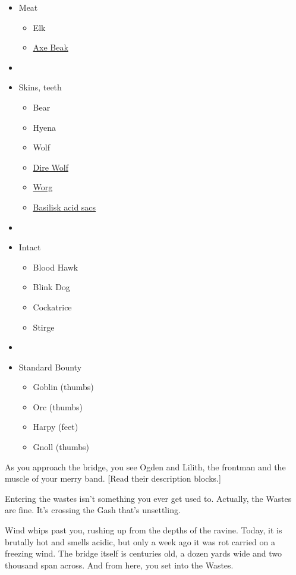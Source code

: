\begin{multicols}{2}
  \newpage
  \begin{itemize}
    \item[] Meat
    \begin{itemize}
      \item Elk
      \item \underline{Axe Beak}
    \end{itemize}
    \item[]
    \item[] Skins, teeth
    \begin{itemize}
      \item Bear
      \item Hyena
      \item Wolf
      \item \underline{Dire Wolf}
      \item \underline{Worg}
      \item \underline{\underline{{Basilisk acid sacs}}}
    \end{itemize}
    \item[]
    \item[] Intact
    \begin{itemize}
      \item Blood Hawk
      \item Blink Dog
      \item Cockatrice
      \item Stirge
    \end{itemize}
    \item[]
    \item[] Standard Bounty
    \begin{itemize}
      \item Goblin (thumbs)
      \item Orc (thumbs)
      \item Harpy (feet)
      \item Gnoll (thumbs)
    \end{itemize}
  \end{itemize}

  \newpage

  As you approach the bridge, you see Ogden and Lilith, the frontman and the muscle
    of your merry band.
  [Read their description blocks.]

  Entering the wastes isn't something you ever get used to.
  Actually, the Wastes are fine.
  It's crossing the Gash that's unsettling.

  Wind whips past you, rushing up from the depths of the ravine.
  Today, it is brutally hot and smells acidic, but only a week ago it was rot carried on
    a freezing wind.
  The bridge itself is centuries old, a dozen yards wide and two thousand span across.
  And from here, you set into the Wastes.


\end{multicols}
